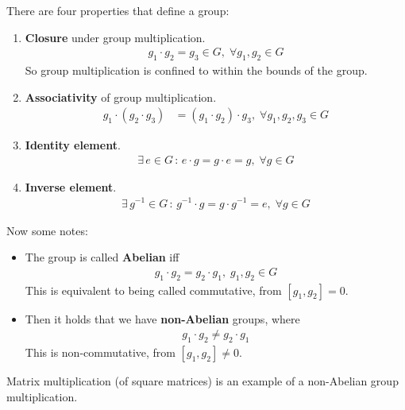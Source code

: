 \documentclass[relqm.tex]{subfiles}
\begin{document}
There are four properties that define a group:
\begin{enumerate}
    \item \textbf{Closure} under group multiplication. 
        \begin{align}
            g_1\cdot g_2 = g_3 \in G,\; \forall g_1,g_2 \in G
        \end{align}
        So group multiplication is confined to within the bounds of the group.
    \item \textbf{Associativity} of group multiplication. 
        \begin{align}
            g_1\cdot(g_2\cdot g_3) &= (g_1\cdot g_2)\cdot g_3,\; \forall g_1,g_2,g_3 \in G
        \end{align}
    \item \textbf{Identity element}. 
        \begin{align}
            \exists\, e \in G\,:\, e\cdot g = g\cdot e = g,\; \forall g \in G
        \end{align}
    \item \textbf{Inverse element}.
        \begin{align}
             \exists\, g^{-1} \in G\,:\, g^{-1}\cdot g = g\cdot g^{-1} = e,\; \forall g \in G
        \end{align}
\end{enumerate}

Now some notes:
\begin{itemize}
    \item The group is called \textbf{Abelian} iff
        \begin{align}
            g_1\cdot g_2 = g_2\cdot g_1,\; g_1,g_2 \in G
        \end{align}
        This is equivalent to being called commutative, from $[g_1,g_2]=0$.
    \item Then it holds that we have \textbf{non-Abelian} groups, where
        \begin{align}
            g_1\cdot g_2 \neq g_2\cdot g_1
        \end{align}
        This is non-commutative, from $[g_1,g_2]\neq0$.
\end{itemize}
Matrix multiplication (of square matrices) is an example of a non-Abelian group multiplication.
\end{document}
